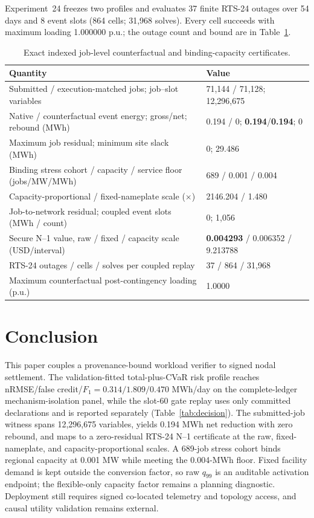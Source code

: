 \documentclass[10pt,journal]{IEEEtran}
\begin{document}
Experiment~24 freezes two profiles and evaluates 37 finite RTS-24 outages over
54 days and 8 event slots (864 cells; 31,968 solves). Every cell succeeds with
maximum loading 1.000000 p.u.; the outage count and bound are in
Table~\ref{tab:jobcounterfactual}.

\begin{table}[t]
\centering
\caption{Exact indexed job-level counterfactual and binding-capacity certificates.}
\label{tab:jobcounterfactual}
\scriptsize
\begin{tabular}{@{}p{}p{}@{}}
\toprule
Quantity & Value\\
\midrule
Submitted / execution-matched jobs; job--slot variables & 71,144 / 71,128; 12,296,675\\
Native / counterfactual event energy; gross/net; rebound (MWh) & 0.194 / 0; \textbf{0.194}/\textbf{0.194}; 0\\
Maximum job residual; minimum site slack (MWh) & 0; 29.486\\
Binding stress cohort / capacity / service floor (jobs/MW/MWh) & 689 / 0.001 / 0.004\\
Capacity-proportional / fixed-nameplate scale ($\times$) & 2146.204 / 1.480\\
Job-to-network residual; coupled event slots (MWh / count) & 0; 1,056\\
Secure N--1 value, raw / fixed / capacity scale (USD/interval) & \textbf{0.004293} / 0.006352 / 9.213788\\
RTS-24 outages / cells / solves per coupled replay & 37 / 864 / 31,968\\
Maximum counterfactual post-contingency loading (p.u.) & 1.0000\\
\bottomrule
\end{tabular}
\end{table}

\section{Conclusion}\label{sec:conclusion}

This paper couples a provenance-bound workload verifier to signed nodal
settlement. The validation-fitted total-plus-CVaR risk profile reaches
nRMSE/false credit/$F_1=0.314/1.809/0.470$ MWh/day on the complete-ledger
mechanism-isolation panel, while the slot-60 gate replay uses only committed
declarations and is reported separately (Table~\ref{tab:decision}). The
submitted-job witness spans 12,296,675 variables, yields 0.194 MWh net
reduction with zero rebound, and maps to a zero-residual RTS-24 N--1
certificate at the raw, fixed-nameplate, and capacity-proportional scales. A
689-job stress cohort binds regional capacity at 0.001 MW while meeting the
0.004-MWh floor. Fixed facility demand is kept outside the conversion factor,
so raw $q_{99}$ is an auditable activation endpoint; the flexible-only
capacity factor remains a planning diagnostic. Deployment still requires
signed co-located telemetry and topology access, and causal utility validation
remains external.

\let\savedthebibliography\thebibliography
\let\savedendthebibliography\endthebibliography
\renewenvironment{thebibliography}[1]{\savedthebibliography{#1}\fontsize{7pt}{8pt}\selectfont}{\savedendthebibliography}


\end{document}
